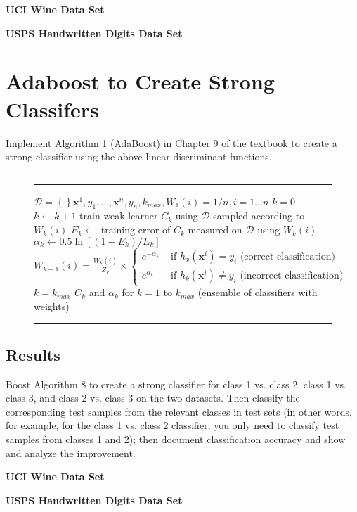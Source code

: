 \documentclass{article}
\newcommand{\mbrace}[1][ ]{\ensuremath{\left\{#1\right\}}}
\newcommand{\mbf}[1]{\ensuremath{\mathbf{#1}}}
\newcommand{\mc}[1]{\ensuremath{\mathcal{#1}}}
\newcommand{\algtab}{\hspace{\algorithmicindent}}
\newcommand{\algtitle}[1]{\smallskip\hrule\smallskip{\bf #1}\smallskip\hrule}
\newenvironment{algo}[1]
{\noindent\ignorespaces\algtitle{#1}\begin{algorithmic}[1]}
{\end{algorithmic}\hrule\smallskip\ignorespacesafterend}
\newcommand{\fakesection}[1]{{\bf #1}\par}
\begin{document}
\bigskip
\fakesection{UCI Wine Data Set}
\bigskip
\fakesection{USPS Handwritten Digits Data Set}


\section{Adaboost to Create Strong Classifers}
Implement Algorithm 1 (AdaBoost) in Chapter 9 of the textbook to create a strong classifier using the above linear discriminant functions.

\begin{figure}[H]
\begin{algo}{Algorithm 9.1 (AdaBoost)}
\newcommand{\mbx}{\mbf{x}}
 $\mc{D} = \mbrace{\mbx^1, y_1, ..., \mbx^n, y_n}, k_{max}, W_1(i) = 1/n, i = 1...n$
\State $k = 0$
 ~$k \gets k+1$
\State\algtab train weak learner $C_k$ using \mc{D} sampled according to $W_k(i)$
\State\algtab $E_k \gets$ training error of $C_k$ measured on \mc{D} using $W_k(i)$
\State\algtab $\alpha_k \gets 0.5 \ln\left[ (1-E_k) / E_k \right]$
\State\algtab $W_{k+1}(i) = \frac{W_k(i)}{Z_k} \times \begin{cases}
e^{-\alpha_k} & \text{ if } h_x(\mbx^i) = y_i \text{ (correct classification)}\\
e^{\alpha_k} & \text{ if } h_k(\mbx^i) \neq y_i \text{ (incorrect classification)}
\end{cases}$
 $k = k_{max}$
 $C_k$ and $\alpha_k$ for $k = 1$ to $k_{max}$ (ensemble of classifiers with weights)
\end{algo}
\end{figure}

\subsection*{Results}
Boost Algorithm 8 to create a strong classifier for class 1 vs. class 2, class 1 vs. class 3, and class 2 vs. class 3 on the two datasets. Then classify the corresponding test samples from the relevant classes in test sets (in other words, for example, for the class 1 vs. class 2 classifier, you only need to classify test samples from classes 1 and 2); then document classification accuracy and show and analyze the improvement.

\bigskip

\fakesection{UCI Wine Data Set}
\bigskip
\fakesection{USPS Handwritten Digits Data Set}
\end{document}
